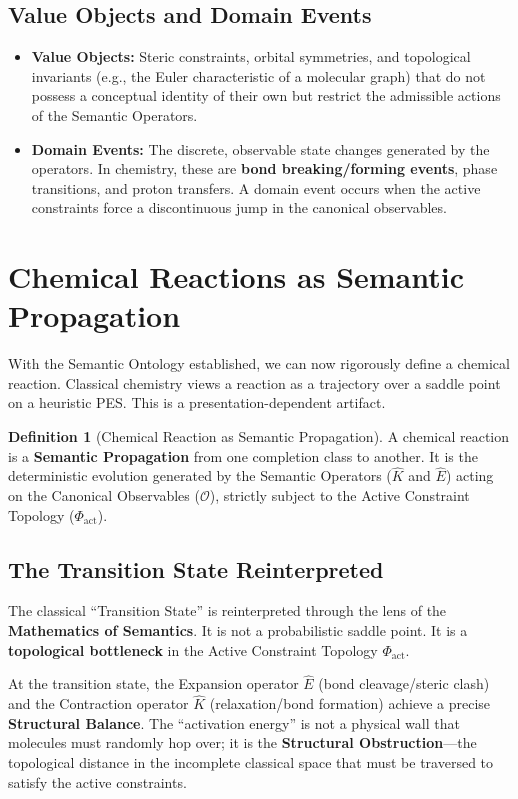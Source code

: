 \documentclass[11pt,openany]{extbook}
\theoremstyle{plain}
\theoremstyle{definition}
\newtheorem{definition}{Definition}[chapter]
\begin{document}
\subsection{Value Objects and Domain Events}
\begin{itemize}
\item \textbf{Value Objects:} Steric constraints, orbital symmetries, and topological invariants (e.g., the Euler characteristic of a molecular graph) that do not possess a conceptual identity of their own but restrict the admissible actions of the Semantic Operators.
\item \textbf{Domain Events:} The discrete, observable state changes generated by the operators. In chemistry, these are \textbf{bond breaking/forming events}, phase transitions, and proton transfers. A domain event occurs when the active constraints force a discontinuous jump in the canonical observables.
\end{itemize}

\section{Chemical Reactions as Semantic Propagation}

With the Semantic Ontology established, we can now rigorously define a chemical reaction. Classical chemistry views a reaction as a trajectory over a saddle point on a heuristic PES. This is a presentation-dependent artifact.

\begin{definition}[Chemical Reaction as Semantic Propagation]
A chemical reaction is a \textbf{Semantic Propagation} from one completion class to another. It is the deterministic evolution generated by the Semantic Operators ($\hat{K}$ and $\hat{E}$) acting on the Canonical Observables ($\mathcal{O}$), strictly subject to the Active Constraint Topology ($\Phi_{\text{act}}$).
\end{definition}

\subsection{The Transition State Reinterpreted}
The classical ``Transition State'' is reinterpreted through the lens of the \textbf{Mathematics of Semantics}. It is not a probabilistic saddle point. It is a \textbf{topological bottleneck} in the Active Constraint Topology $\Phi_{\text{act}}$.

At the transition state, the Expansion operator $\hat{E}$ (bond cleavage/steric clash) and the Contraction operator $\hat{K}$ (relaxation/bond formation) achieve a precise \textbf{Structural Balance}. The ``activation energy'' is not a physical wall that molecules must randomly hop over; it is the \textbf{Structural Obstruction}---the topological distance in the incomplete classical space that must be traversed to satisfy the active constraints.
\end{document}
